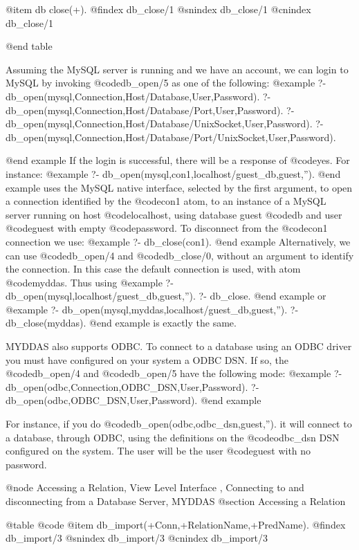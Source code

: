 @item db close(+). 
@findex db_close/1
@snindex db_close/1
@cnindex db_close/1

@end table 

  Assuming the MySQL server is running and we have an account, we can
login to MySQL by invoking @code{db_open/5} as one of the following:
@example
?- db_open(mysql,Connection,Host/Database,User,Password). 
?- db_open(mysql,Connection,Host/Database/Port,User,Password).
?- db_open(mysql,Connection,Host/Database/UnixSocket,User,Password). 
?- db_open(mysql,Connection,Host/Database/Port/UnixSocket,User,Password).

@end example
If the login is successful, there will be a response of @code{yes}. For
instance:
 @example
?- db_open(mysql,con1,localhost/guest_db,guest,'').
@end example
uses the MySQL native interface, selected by the first argument, to open
a connection identified by the @code{con1} atom, to an instance of a
MySQL server running on host @code{localhost}, using database guest @code{db}
and user @code{guest} with empty @code{password}.  To disconnect from the @code{con1}
connection we use: 
@example
?- db_close(con1).
@end example
 Alternatively, we can use @code{db_open/4} and @code{db_close/0,} without an argument
to identify the connection. In this case the default connection is used,
with atom @code{myddas}. Thus using 
@example
?- db_open(mysql,localhost/guest_db,guest,''). 
?- db_close.  
@end example
or
@example
?- db_open(mysql,myddas,localhost/guest_db,guest,''). 
?- db_close(myddas). 
@end example
is exactly the same.

MYDDAS also supports ODBC. To connect to a database using an ODBC driver
you must have configured on your system a ODBC DSN. If so, the @code{db_open/4}
and @code{db_open/5} have the following mode:
@example
 ?- db_open(odbc,Connection,ODBC_DSN,User,Password). 
 ?- db_open(odbc,ODBC_DSN,User,Password).
@end example

For instance, if you do @code{db_open(odbc,odbc_dsn,guest,'')}. it will connect
to a database, through ODBC, using the definitions on the @code{odbc_dsn} DSN
configured on the system. The user will be the user @code{guest} with no
password.

@node Accessing a Relation, View Level Interface , Connecting to and disconnecting from a Database Server, MYDDAS 
@section Accessing a Relation

@table @code
@item db_import(+Conn,+RelationName,+PredName). 
@findex db_import/3
@snindex db_import/3
@cnindex db_import/3

